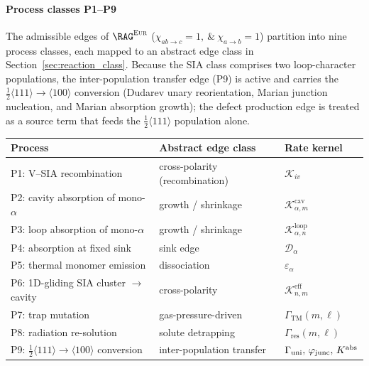 \paragraph{Process classes P1--P9}
The admissible edges of $\RAG^{\textsc{Eur}}$
($\chi_{ab\rightarrow c}=1,\ \&\ \chi_{a\rightarrow b}=1$) partition into nine
process classes, each mapped to an abstract edge class in
Section~\ref{sec:reaction_class}. Because the SIA class comprises two
loop-character populations, the inter-population transfer edge (P9) is active
and carries the $\tfrac{1}{2}\langle 111\rangle\!\to\!\langle 100\rangle$
conversion (Dudarev unary reorientation, Marian junction nucleation, and Marian
absorption growth); the defect production edge is treated as a source term that
feeds the $\tfrac12\langle111\rangle$ population alone.
\begin{center}
\renewcommand{\arraystretch}{1.1}
\begin{tabular}{@{}lll@{}}
\toprule
\textbf{Process} & \textbf{Abstract edge class} & \textbf{Rate kernel} \\
\midrule
P1: V--SIA recombination & cross-polarity (recombination) & $\mathcal{K}_{iv}$ \\
P2: cavity absorption of mono-$\alpha$ & growth / shrinkage & $\mathcal{K}^{\mathrm{cav}}_{\alpha,m}$ \\
P3: loop absorption of mono-$\alpha$ & growth / shrinkage & $\mathcal{K}^{\mathrm{loop}}_{\alpha,n}$ \\
P4: absorption at fixed sink & sink edge & $\mathcal{D}_\alpha$ \\
P5: thermal monomer emission & dissociation & $\varepsilon_\alpha$ \\
P6: 1D-gliding SIA cluster $\to$ cavity & cross-polarity & $\mathcal{K}^{\mathrm{eff}}_{n,m}$ \\
P7: trap mutation & gas-pressure-driven & $\Gamma_{\mathrm{TM}}(m,\ell)$ \\
P8: radiation re-solution & solute detrapping & $\Gamma_{\mathrm{res}}(m,\ell)$ \\
P9: $\tfrac{1}{2}\langle 111\rangle\!\to\!\langle 100\rangle$ conversion & inter-population transfer & $\Gamma_{\mathrm{uni}},\,\varphi_{\rm junc},\,K^{\rm abs}$ \\
\bottomrule
\end{tabular}
\end{center}

